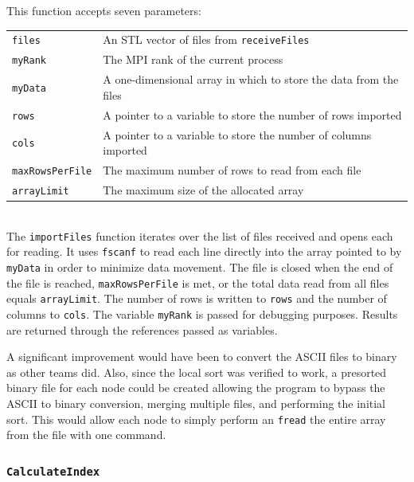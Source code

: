 \documentclass{article}
\begin{document}
This function accepts seven parameters: \\

\begin{tabular}{l l}
\texttt{\texttt{files}}          & An STL vector of files from \texttt{receiveFiles} \\
\texttt{\texttt{myRank}}         & The MPI rank of the current process \\
\texttt{\texttt{myData}}         & A one-dimensional array in which to store the data from the files \\
\texttt{\texttt{rows}}           & A pointer to a variable to store the number of rows imported \\
\texttt{\texttt{cols}}           & A pointer to a variable to store the number of columns imported  \\
\texttt{\texttt{maxRowsPerFile}} & The maximum number of rows to read from each file \\
\texttt{\texttt{arrayLimit}}     & The maximum size of the allocated array \\
\end{tabular} \\

The \texttt{importFiles} function iterates over the list of files received and opens each for reading. It uses \texttt{fscanf} to read each line directly into the array pointed to by \texttt{myData} in order to minimize data movement. The file is closed when the end of the file is reached, \texttt{maxRowsPerFile} is met, or the total data read from all files equals \texttt{arrayLimit}. The number of rows is written to \texttt{rows} and the number of columns to \texttt{cols}. The variable \texttt{myRank} is passed for debugging purposes. Results are returned through the references passed as variables.

A significant improvement would have been to convert the ASCII files to binary as other teams did. Also, since the local sort was verified to work, a presorted binary file for each node could be created allowing the program to bypass the ASCII to binary conversion, merging multiple files, and performing the initial sort. This would allow each node to simply perform an \texttt{fread} the entire array from the file with one command.


%
%

\subsubsection{\texttt{CalculateIndex}}\label{sec:calculateindex}
\end{document}
